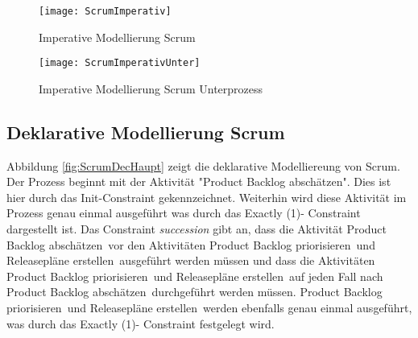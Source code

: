 \begin{sidewaysfigure}[htp]
\begin{center}
  \texttt{[image: ScrumImperativ]} %
  \caption{Imperative Modellierung Scrum}
  \label{fig:ScrumImperativ}
\end{center}
\end{sidewaysfigure}

\begin{figure}[htp]
\begin{center}
  \texttt{[image: ScrumImperativUnter]} %
  \caption{Imperative Modellierung Scrum Unterprozess}
  \label{fig:ScrumImperativUnter}
\end{center}
\end{figure}
\clearpage

\subsection{Deklarative Modellierung Scrum}

Abbildung \ref{fig:ScrumDecHaupt} zeigt die deklarative Modelliereung von Scrum. Der Prozess beginnt mit der Aktivität "Product Backlog abschätzen". Dies ist hier durch das Init-Constraint gekennzeichnet. Weiterhin wird diese Aktivität im Prozess genau einmal ausgeführt was durch das Exactly (1)- Constraint dargestellt ist. Das Constraint \textit{succession} gibt an, dass die Aktivität \grqq Product Backlog abschätzen\grqq \ vor den Aktivitäten \grqq Product Backlog priorisieren\grqq \ und \grqq Releasepläne erstellen\grqq \ ausgeführt werden müssen und dass die Aktivitäten \grqq Product Backlog priorisieren\grqq \ und \grqq Releasepläne erstellen\grqq \ auf jeden Fall nach \grqq Product Backlog abschätzen\grqq \ durchgeführt werden müssen. \grqq Product Backlog priorisieren\grqq \ und \grqq Releasepläne erstellen\grqq \ werden ebenfalls genau einmal ausgeführt, was durch das Exactly (1)- Constraint festgelegt wird.  \newline

